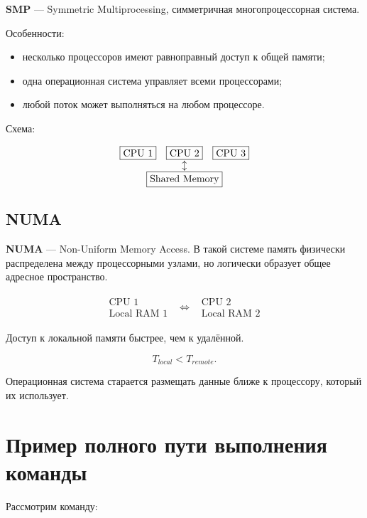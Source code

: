 \documentclass[12pt,a4paper]{article}
\theoremstyle{remark}
\begin{document}
\textbf{SMP} --- Symmetric Multiprocessing, симметричная многопроцессорная система.

Особенности:
\begin{itemize}
    \item несколько процессоров имеют равноправный доступ к общей памяти;
    \item одна операционная система управляет всеми процессорами;
    \item любой поток может выполняться на любом процессоре.
\end{itemize}

Схема:

\[
\begin{array}{ccc}
\boxed{\text{CPU 1}} & \boxed{\text{CPU 2}} & \boxed{\text{CPU 3}} \\
\multicolumn{3}{c}{\updownarrow} \\
\multicolumn{3}{c}{\boxed{\text{Shared Memory}}}
\end{array}
\]

\subsection{NUMA}

\textbf{NUMA} --- Non-Uniform Memory Access. В такой системе память физически распределена между процессорными узлами, но логически образует общее адресное пространство.

\[
\begin{array}{ccc}
\boxed{
\begin{array}{c}
\text{CPU 1}\\
\text{Local RAM 1}
\end{array}}
&
\Longleftrightarrow
&
\boxed{
\begin{array}{c}
\text{CPU 2}\\
\text{Local RAM 2}
\end{array}}
\end{array}
\]

Доступ к локальной памяти быстрее, чем к удалённой.

\[
T_{local} < T_{remote}.
\]

Операционная система старается размещать данные ближе к процессору, который их использует.

\section{Пример полного пути выполнения команды}

Рассмотрим команду:
\end{document}
